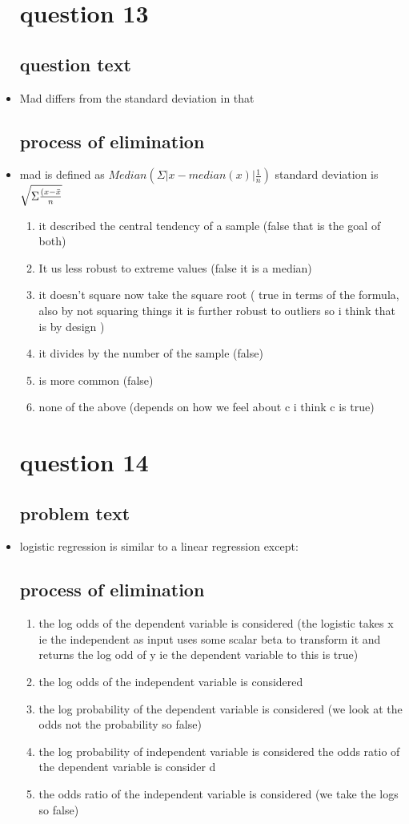 \documentclass{article}
\begin{document}
\begin{itemize}
\section{ question 13}
\subsection{question text}
\item Mad differs from the standard deviation in that 
\subsection{process of elimination}
\item mad is defined as $Median(\Sigma|x-median(x)|\frac{1}{n})$ standard deviation is $\sqrt{\Sigma\frac{(x-\Bar{x}}{n}}$
\begin{enumerate}
    \item it described the central tendency of a sample (false that is the goal of both)
    \item It us less robust to extreme values (false it is a median)
    \item it doesn't square now take the square root ( true in terms of the formula, also by not squaring things it is further robust to outliers so i think that is by design )
    \item it divides by the number of the sample (false)
    \item is more common (false)
    \item none of the above (depends on how we feel about c i think c is true)
\end{enumerate}
\section{question 14}
\subsection{problem text}
\item logistic regression is similar to a linear regression except:
\subsection{process of elimination}
\begin{enumerate}
    \item the log odds of the dependent variable is considered (the logistic takes x ie the independent as input uses some scalar beta to transform it and returns the log odd of y ie the dependent variable to this is true)
    \item the log odds of the independent variable is considered 
    \item the log probability of the dependent variable is considered (we look at the odds not the probability so false) 
    \item the log probability of independent variable is considered
    \itme the odds ratio of the dependent variable is consider d
    \item the odds ratio of the  independent variable is considered (we take the logs so false)
\end{enumerate}


\end{itemize}
\end{document}
